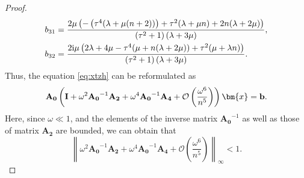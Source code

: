 \documentclass[11pt,reqno,twoside]{amsart}
\theoremstyle{definition}
\theoremstyle{remark}
\numberwithin{equation}{section}
\begin{document}
\begin{proof}
\begin{align}
		b_{31}&=\frac{2 \mu  \left(-\left(\tau ^4 (\lambda +\mu  (n+2))\right)+\tau ^2 (\lambda +\mu  n)+2 n (\lambda +2 \mu )\right)}{ \left(\tau ^2+1\right) (\lambda +3 \mu )},\notag\\
		b_{32}&=\frac{2 \mathrm{i} \mu  \left(2 \lambda +4 \mu -\tau ^4 (\mu +n (\lambda +2 \mu ))+\tau ^2 (\mu +\lambda  n)\right)}{ \left(\tau ^2+1\right) (\lambda +3 \mu )}.\notag
	\end{align}
	Thus, the equation \eqref{eq:xtzh} can be reformulated as 
	\begin{align}
		\mathbf{A_0}\left(\mathbf{I}+\omega^2\mathbf{A_0}^{-1}\mathbf{A_2}+\omega^4\mathbf{A_0}^{-1}\mathbf{A_4}+\mathcal{O}\left(\frac{\omega^6}{n^5}\right)\right)\bm{x}=\mathbf{b}.\notag
	\end{align}
	Here, since \(\omega \ll 1\), and the elements of the inverse matrix $\mathbf{A_0}^{-1}$ as well as those of matrix $\mathbf{A_2}$ are bounded, we can obtain that
	\[
	\left\|\omega^2\mathbf{A_0}^{-1}\mathbf{A_2}+\omega^4\mathbf{A_0}^{-1}\mathbf{A_4}+\mathcal{O}\left(\frac{\omega^6}{n^5}\right)\right\|_{\infty}<1.
	\]
	

\end{proof}
\end{document}
